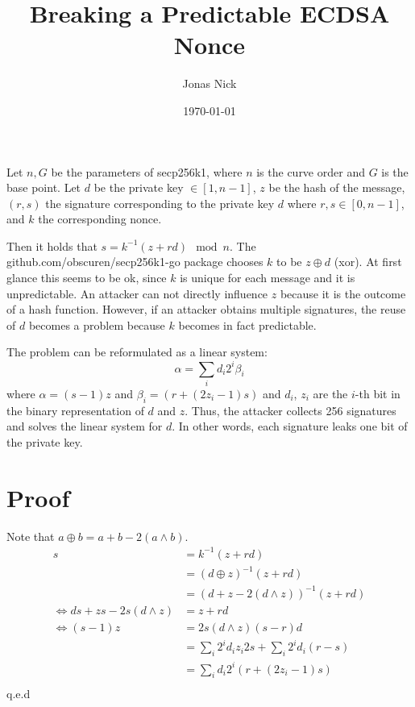 \documentclass[11pt,a4paper,oneside]{article}
\title{Breaking a Predictable ECDSA Nonce}
\date{\today}
\author{Jonas Nick}
\begin{document}
\maketitle 
Let $n, G$ be the parameters of secp256k1, where $n$ is the curve order and $G$ is the base point.
Let $d$ be the private key $\in [1, n-1]$, $z$ be the hash of the message, $(r,s)$ the signature corresponding
to the private key $d$ where $r,s \in [0, n-1]$, and $k$ the corresponding nonce.

Then it holds that $s=k^{-1}(z+rd)\mod n$. The github.com/obscuren/secp256k1-go package chooses $k$ to be
$z\oplus d$ (xor). 
At first glance this seems to be ok, since $k$ is unique for each message and
it is unpredictable. An attacker can not directly influence $z$ because it is the outcome of a hash function.
However, if an attacker obtains multiple signatures, the reuse of $d$ becomes a problem because $k$ 
becomes in fact predictable. 

The problem can be reformulated as a linear system:
\begin{equation}
    \alpha = \sum_i d_i 2^i \beta_i
\end{equation}
where $\alpha = (s-1)z$ and $\beta_i = (r + (2z_i - 1)s)$ and $d_i$, $z_i$ are the $i$-th bit in the binary representation of $d$ and $z$.
Thus, the attacker collects 256 signatures and solves the linear system for $d$. 
In other words, each signature leaks one bit of the private key.

\section{Proof}

Note that $a \oplus b = a + b - 2(a\wedge b)$.
\begin{align*}
s&=k^{-1}(z+rd) \\
    &= (d\oplus z)^{-1}(z+rd)\\
    &= (d + z - 2(d\wedge z))^{-1}(z+rd)\\
    \iff ds + zs - 2s(d\wedge z)&= z + rd\\
    \iff (s-1)z &= 2s(d\wedge z) (s-r)d\\
                &= \sum_i 2^i d_i z_i 2s + \sum_i 2^i d_i (r-s) \\
                &= \sum_i d_i 2^i (r + (2z_i - 1)s) \\
\end{align*}
q.e.d
\end{document}
